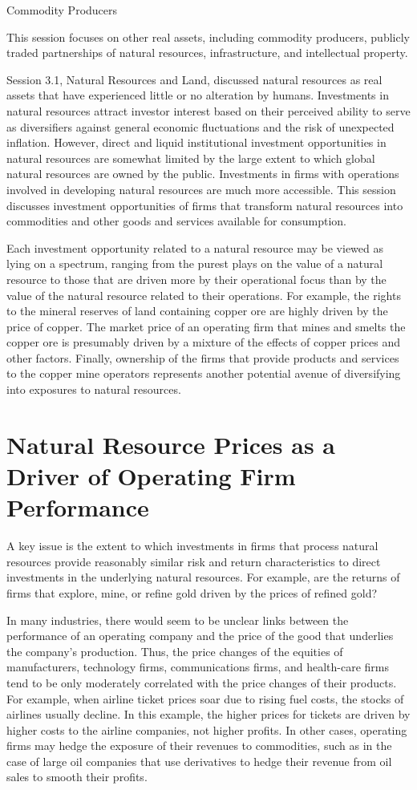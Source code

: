 \documentclass[11pt]{article}
\begin{document}
Commodity Producers

This session focuses on other real assets, including commodity producers, publicly traded partnerships of natural resources, infrastructure, and intellectual property.

Session 3.1, Natural Resources and Land, discussed natural resources as real assets that have experienced little or no alteration by humans. Investments in natural resources attract investor interest based on their perceived ability to serve as diversifiers against general economic fluctuations and the risk of unexpected inflation. However, direct and liquid institutional investment opportunities in natural resources are somewhat limited by the large extent to which global natural resources are owned by the public. Investments in firms with operations involved in developing natural resources are much more accessible. This session discusses investment opportunities of firms that transform natural resources into commodities and other goods and services available for consumption.

Each investment opportunity related to a natural resource may be viewed as lying on a spectrum, ranging from the purest plays on the value of a natural resource to those that are driven more by their operational focus than by the value of the natural resource related to their operations. For example, the rights to the mineral reserves of land containing copper ore are highly driven by the price of copper. The market price of an operating firm that mines and smelts the copper ore is presumably driven by a mixture of the effects of copper prices and other factors. Finally, ownership of the firms that provide products and services to the copper mine operators represents another potential avenue of diversifying into exposures to natural resources.

\section*{Natural Resource Prices as a Driver of Operating Firm Performance}
A key issue is the extent to which investments in firms that process natural resources provide reasonably similar risk and return characteristics to direct investments in the underlying natural resources. For example, are the returns of firms that explore, mine, or refine gold driven by the prices of refined gold?

In many industries, there would seem to be unclear links between the performance of an operating company and the price of the good that underlies the company's production. Thus, the price changes of the equities of manufacturers, technology firms, communications firms, and health-care firms tend to be only moderately correlated with the price changes of their products. For example, when airline ticket prices soar due to rising fuel costs, the stocks of airlines usually decline. In this example, the higher prices for tickets are driven by higher costs to the airline companies, not higher profits. In other cases, operating firms may hedge the exposure of their revenues to commodities, such as in the case of large oil companies that use derivatives to hedge their revenue from oil sales to smooth their profits.
\end{document}
